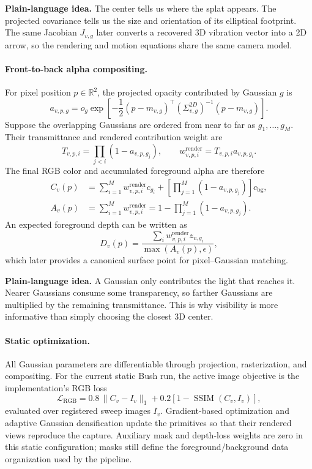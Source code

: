 \documentclass[10pt]{article}
\newcommand{\plainidea}[1]{%
  \vspace{0.25em}
  \noindent\colorbox{SoftGray}{%
    \parbox{\dimexpr\linewidth-2\fboxsep\relax}{%
      \textbf{Plain-language idea.} #1}}
  \vspace{0.25em}
}
\begin{document}
\plainidea{The center tells us where the splat appears. The projected
covariance tells us the size and orientation of its elliptical footprint. The
same Jacobian $J_{v,g}$ later converts a recovered 3D vibration vector into a
2D arrow, so the rendering and motion equations share the same camera model.}

\paragraph{Front-to-back alpha compositing.}
For pixel position $p\in\mathbb R^2$, the projected opacity contributed by
Gaussian $g$ is
\begin{equation}
  a_{v,p,g}
  =o_g\exp\!\left[
    -\frac{1}{2}(p-m_{v,g})^\top
    (\Sigma^{2D}_{v,g})^{-1}(p-m_{v,g})
  \right].
\end{equation}
Suppose the overlapping Gaussians are ordered from near to far as
$g_1,\ldots,g_M$. Their transmittance and rendered contribution weight are
\begin{equation}
  T_{v,p,i}=\prod_{j<i}(1-a_{v,p,g_j}),
  \qquad
  w^{\mathrm{render}}_{v,p,i}=T_{v,p,i}a_{v,p,g_i}.
\end{equation}
The final RGB color and accumulated foreground alpha are therefore
\begin{align}
  C_v(p)
  &=\sum_{i=1}^{M}w^{\mathrm{render}}_{v,p,i}c_{g_i}
    +\left[\prod_{j=1}^{M}(1-a_{v,p,g_j})\right]c_{\mathrm{bg}},\\
  A_v(p)
  &=\sum_{i=1}^{M}w^{\mathrm{render}}_{v,p,i}
   =1-\prod_{j=1}^{M}(1-a_{v,p,g_j}).
\end{align}
An expected foreground depth can be written as
\begin{equation}
  D_v(p)
  =\frac{\sum_iw^{\mathrm{render}}_{v,p,i}z_{v,g_i}}
  {\max(A_v(p),\epsilon)},
\end{equation}
which later provides a canonical surface point for pixel--Gaussian matching.

\plainidea{A Gaussian only contributes the light that reaches it. Nearer
Gaussians consume some transparency, so farther Gaussians are multiplied by
the remaining transmittance. This is why visibility is more informative than
simply choosing the closest 3D center.}

\paragraph{Static optimization.}
All Gaussian parameters are differentiable through projection, rasterization,
and compositing. For the current static Bush run, the active image objective is
the implementation's RGB loss
\begin{equation}
  \mathcal L_{\mathrm{RGB}}
  =0.8\,\lVert C_v-I_v\rVert_1
   +0.2\left[1-\operatorname{SSIM}(C_v,I_v)\right],
\end{equation}
evaluated over registered sweep images $I_v$. Gradient-based optimization and
adaptive Gaussian densification update the primitives so that their rendered
views reproduce the capture. Auxiliary mask and depth-loss weights are zero in
this static configuration; masks still define the foreground/background data
organization used by the pipeline.
\end{document}
